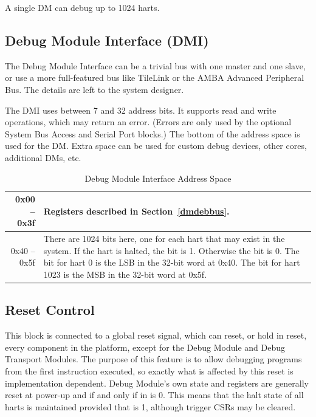 \documentclass{article}
\begin{document}
A single DM can debug up to 1024 harts.

\subsection{Debug Module Interface (DMI)} \label{dmi}

The Debug Module Interface can be a trivial bus with one master and one slave,
or use a more full-featured bus like TileLink or the AMBA Advanced Peripheral
Bus. The details are left to the system designer.

The DMI uses between 7 and 32 address bits.  It supports read and write
operations, which may return an error. (Errors are only used by the optional
System Bus Access and Serial Port blocks.) The bottom of the address space is
used for the DM. Extra space can be used for custom debug devices, other cores,
additional DMs, etc.

\begin{table}[htp]
    \centering
    \caption{Debug Module Interface Address Space}
    \label{tab:header}
    \begin{tabulary}{\textwidth}{|r|L|}
        \hline
        0x00 -- 0x3f & Registers described in Section~\ref{dmdebbus}. \\
        \hline
        0x40 -- 0x5f & There are 1024 bits here, one for each hart that may
        exist in the system. If the hart is halted, the bit is 1.  Otherwise
        the bit is 0. The bit for hart 0 is the LSB in the 32-bit word at 0x40.
        The bit for hart 1023 is the MSB in the 32-bit word at 0x5f. \\
        \hline
    \end{tabulary}
\end{table}

\subsection{Reset Control} \label{reset}

This block is connected to a global reset signal, which can
reset, or hold in reset, every component in the platform,
except for the Debug Module and Debug
Transport Modules. The purpose of this feature is to allow debugging
programs from the first instruction executed, so exactly what is affected
by this reset is implementation dependent. Debug Module's own state and registers are
generally reset at power-up and if and only if
\Fdmactive in \Rdmcontrol is 0. This means that the halt state of all harts is
maintained provided that \Fdmactive is 1, although trigger CSRs may be cleared.
\end{document}
